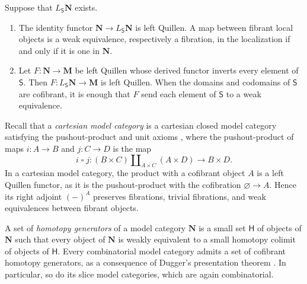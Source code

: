 \documentclass[10pt,reqno]{amsart}
\begin{document}
\begin{proposition}
\label{prop:localization_recollections}
Suppose that $L_{\mathsf S}\mathbf N$ exists.
\begin{enumerate}[label=\textup{(\arabic*)}]
\item The identity functor $\mathbf N\to L_{\mathsf S}\mathbf N$
is left Quillen. A map between fibrant local objects is a weak
equivalence, respectively a fibration, in the localization if and only
if it is one in $\mathbf N$.
\item Let $F:\mathbf N\to\mathbf M$ be left Quillen whose derived
functor inverts every element of $\mathsf S$. Then
$F:L_{\mathsf S}\mathbf N\to\mathbf M$ is left Quillen. When the
domains and codomains of $\mathsf S$ are cofibrant, it is enough
that $F$ send each element of $\mathsf S$ to a weak equivalence.
\end{enumerate}
\end{proposition}

Recall that a \emph{cartesian model category} is a cartesian closed
model category satisfying the pushout-product and unit axioms
\cite[\S4.2]{hovey1999model}, where the pushout-product of maps
$i:A\to B$ and $j:C\to D$ is the map
\[
i\mathbin{\square}j:
(B\times C)\amalg_{A\times C}(A\times D)\longrightarrow B\times D.
\]
In a cartesian model category, the product with a cofibrant object
$A$ is a left Quillen functor, as it is the pushout-product with the
cofibration $\varnothing\to A$. Hence its right adjoint $(-)^A$
preserves fibrations, trivial fibrations, and weak equivalences
between fibrant objects.

\begin{notation}
\label{not:homotopy_generators}
A set of \emph{homotopy generators} of a model category $\mathbf N$
is a small set $\mathsf H$ of objects of $\mathbf N$ such that
every object of $\mathbf N$ is weakly equivalent to a small homotopy
colimit of objects of $\mathsf H$. Every combinatorial model
category admits a set of cofibrant homotopy generators, as a
consequence of Dugger's presentation theorem \cite{Dug01}. In
particular, so do its slice model categories, which are again
combinatorial.
\end{notation}
\end{document}
